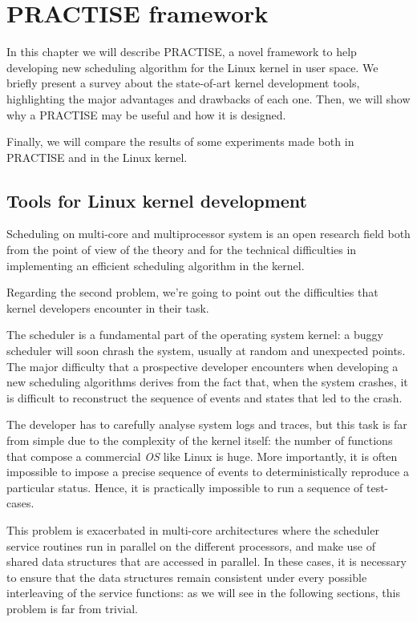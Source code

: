 \chapter{PRACTISE framework\label{chap:PRACTISE}}

In this chapter we will describe PRACTISE, a novel framework to help developing
new scheduling algorithm for the Linux kernel in user space. 
We briefly present a survey about the state-of-art kernel development tools,
highlighting the major advantages and drawbacks of each one. Then, we will show 
why a PRACTISE may be useful and how it is designed.

Finally, we will compare the results of some experiments made both in PRACTISE 
and in the Linux kernel.

\section{Tools for Linux kernel development\label{kernel_dev_tools}}
Scheduling on multi-core and multiprocessor system is an open research field
both from the point of view of the theory and for the technical difficulties in
implementing an efficient scheduling algorithm in the kernel.

Regarding the second problem, we're going to point out the difficulties that kernel
developers encounter in their task.

The scheduler is a fundamental part of the operating system kernel: a buggy scheduler
will soon chrash the system, usually at random and unexpected points. The major difficulty
that a prospective developer encounters when developing a new scheduling algorithms derives
from the fact that, when the system crashes, it is difficult to reconstruct the sequence
of events and states that led to the crash.

The developer has to carefully analyse system logs and traces, but this task is far
from simple due to the complexity of the kernel itself: the number of functions that compose
a commercial \emph{OS} like Linux is huge. More importantly, it is often impossible to 
impose a precise sequence of events to deterministically reproduce a particular status.
Hence, it is practically impossible to run a sequence of test-cases.

This problem is exacerbated in multi-core architectures where the scheduler service routines
run in parallel on the different processors, and make use of shared data structures that are
accessed in parallel. In these cases, it is necessary to ensure that the data structures
remain consistent under every possible interleaving of the service functions: as we will see
in the following sections, this problem is far from trivial.

